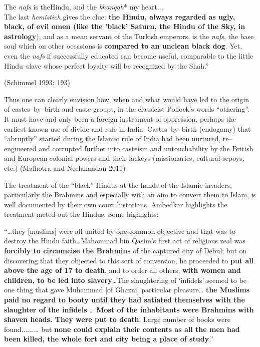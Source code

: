 \begin{myquote}
The \textit{nafs} is theHindu, and the \textit{khanqah}* my heart...\\ The last \textit{hemistich} gives the clue: \textbf{the Hindu, always regarded as ugly, black, of evil omen (like the 'black' Saturn, the Hindu of the Sky, in astrology}), and as a mean servant of the Turkish emperors, is the \textit{nafs}, the base soul which on other occasions is \textbf{compared to an unclean black dog}. Yet, even the \textit{nafs} if successfully educated can become useful, comparable to the little Hindu–slave whose perfect loyalty will be recognized by the Shah.” 
\begin{myquote}
(Schimmel 1993: 193)
\end{myquote}
\end{myquote}

Thus one can clearly envision how, when and what would have led to the origin of castes–by–birth and caste groups, in the classicist Pollock's words “othering”. It must have and only been a foreign instrument of oppression, perhaps the earliest known use of divide and rule in India. Castes–by–birth (endogamy) that “abruptly” started during the Islamic rule of India had been nurtured, re–engineered and corrupted further into casteism and untouchability by the British and European colonial powers and their lackeys (missionaries, cultural sepoys, etc.) (Malhotra and Neelakandan 2011)

The treatment of the “black” Hindus at the hands of the Islamic invaders, particularly the Brahmins and especially with an aim to convert them to Islam, is well documented by their own court historians. Ambedkar highlights the treatment meted out the Hindus. Some highlights:

\begin{myquote}
“…they [muslims] were all united by one common objective and that was to destroy the Hindu faith…Mahommad bin Qasim's first act of religious zeal was \textbf{forcibly to circumcise the Brahmins} of the captured city of Debul; but on discovering that they objected to this sort of conversion, he proceeded to \textbf{put all above the age of 17 to death}, and to order all others, \textbf{with women and children, to be led into slavery}…The slaughtering of ‘infidels’ seemed to be one thing that gave Muhammad [of Ghazni] particular pleasure… \textbf{the Muslims paid no regard to booty until they had satiated themselves with the slaughter of the infidels} … \textbf{Most of the inhabitants were Brahmins with shaven heads. They were put to death}. Large number of books were found......... but \textbf{none could explain their contents as all the men had been killed, the whole fort and city being a place of study}.”
\end{myquote}

